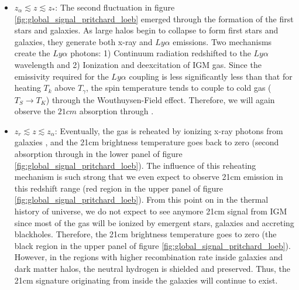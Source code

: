\documentclass[12pt, TexShade, letterpaper]{report}
\begin{document}
\begin{itemize}
\item $z_\alpha \lesssim z \lesssim z_*$: The second fluctuation in figure \ref{fig:global_signal_pritchard_loeb} emerged through the formation of the first stars and galaxies. As large halos begin to collapse to form first stars and galaxies, they generate both x-ray and $Ly\alpha$ emissions. Two mechanisms create the $Ly\alpha$ photons: 1) Continuum radiation redshifted to the $Ly\alpha$ wavelength and 2) Ionization and deexcitation of IGM gas. Since the emissivity required for the $Ly\alpha$ coupling is less significantly less than that for heating $T_k$ above $T_\gamma$, the spin temperature tends to couple to cold gas ($T_S \rightarrow T_K$) through the Wouthuysen-Field effect. Therefore, we will again observe the $21cm$ absorption through \cite{map_universe, 21century}.\par

\item $z_r \lesssim z \lesssim z_\alpha$: Eventually, the gas is reheated by ionizing x-ray photons from galaxies \cite{21century}, and the 21cm brightness temperature goes back to zero (second absorption through in the lower panel of figure \ref{fig:global_signal_pritchard_loeb}). The influence of this reheating mechanism is such strong that we even expect to observe 21cm emission in this redshift range (red region in the upper panel of figure \ref{fig:global_signal_pritchard_loeb}). From this point on in the thermal history of universe, we do not expect to see anymore 21cm signal from IGM since most of the gas will be ionized by emergent stars, galaxies and accreting blackholes. Therefore, the 21cm brightness temperature goes to zero (the black region in the upper panel of figure \ref{fig:global_signal_pritchard_loeb}). However, in the regions with higher recombination rate inside galaxies and dark matter halos, the neutral hydrogen is shielded and preserved. Thus, the 21cm signature originating from inside the galaxies will continue to exist\cite{map_universe, 21century}.\par
\end{itemize}
\end{document}
